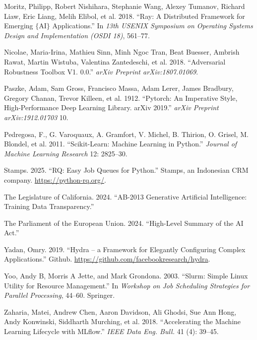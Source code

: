 \documentclass[
]{article}
\newlength{\cslhangindent}
\newlength{\cslentryspacingunit} %
\newenvironment{CSLReferences}[2] %
 {%
  \setlength{\parindent}{0pt}
  \ifodd #1
  \let\oldpar\par
  \def\par{\hangindent=\cslhangindent\oldpar}
  \fi
  \setlength{\parskip}{#2\cslentryspacingunit}
 }%
 {}
\begin{document}
\begin{CSLReferences}{1}{0}
\leavevmode{}%
Moritz, Philipp, Robert Nishihara, Stephanie Wang, Alexey Tumanov,
Richard Liaw, Eric Liang, Melih Elibol, et al. 2018. {``Ray: A
Distributed Framework for Emerging \(\{\)AI\(\}\) Applications.''} In
\emph{13th USENIX Symposium on Operating Systems Design and
Implementation (OSDI 18)}, 561--77.

\leavevmode{}%
Nicolae, Maria-Irina, Mathieu Sinn, Minh Ngoc Tran, Beat Buesser,
Ambrish Rawat, Martin Wistuba, Valentina Zantedeschi, et al. 2018.
{``Adversarial Robustness Toolbox V1. 0.0.''} \emph{arXiv Preprint
arXiv:1807.01069}.

\leavevmode{}%
Paszke, Adam, Sam Gross, Francisco Massa, Adam Lerer, James Bradbury,
Gregory Chanan, Trevor Killeen, et al. 1912. {``Pytorch: An Imperative
Style, High-Performance Deep Learning Library\@. arXiv 2019.''}
\emph{arXiv Preprint arXiv:1912.01703} 10.

\leavevmode{}%
Pedregosa, F., G. Varoquaux, A. Gramfort, V. Michel, B. Thirion, O.
Grisel, M. Blondel, et al. 2011. {``Scikit-Learn: Machine Learning in
{P}ython.''} \emph{Journal of Machine Learning Research} 12: 2825--30.

\leavevmode{}%
Stamps. 2025. {``RQ: Easy Job Queues for Python.''} Stamps, an
Indonesian CRM company. \url{https://python-rq.org/}.

\leavevmode{}%
The Legislature of California. 2024. {``AB-2013 Generative Artificial
Intelligence: Training Data Transparency.''}

\leavevmode{}%
The Parliament of the European Union. 2024. {``High-Level Summary of the
AI Act.''}

\leavevmode{}%
Yadan, Omry. 2019. {``Hydra -- a Framework for Elegantly Configuring
Complex Applications.''} Github.
\url{https://github.com/facebookresearch/hydra}.

\leavevmode{}%
Yoo, Andy B, Morris A Jette, and Mark Grondona. 2003. {``Slurm: Simple
Linux Utility for Resource Management.''} In \emph{Workshop on Job
Scheduling Strategies for Parallel Processing}, 44--60. Springer.

\leavevmode{}%
Zaharia, Matei, Andrew Chen, Aaron Davidson, Ali Ghodsi, Sue Ann Hong,
Andy Konwinski, Siddharth Murching, et al. 2018. {``Accelerating the
Machine Learning Lifecycle with MLflow.''} \emph{IEEE Data Eng. Bull.}
41 (4): 39--45.

\end{CSLReferences}
\end{document}
